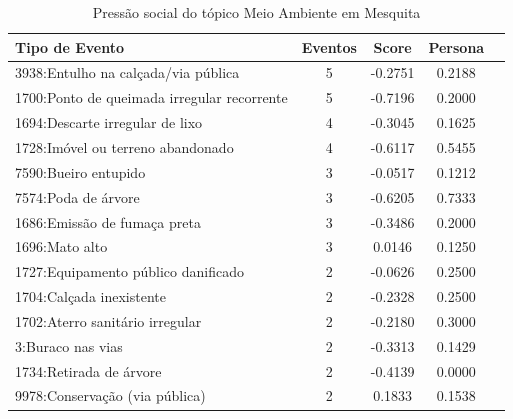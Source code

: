\begin{table}[htbp]
	\centering
	\caption{Pressão social do tópico Meio Ambiente em Mesquita}
	\label{tab:eventos_populares_mesquita}
	\begin{tabular}{|l|c|c|c|c|}
		\hline
		\textbf{Tipo de Evento}                         & \textbf{Eventos} & \textbf{Score} & \textbf{Persona} \\
		\hline
		3938:Entulho na calçada/via pública             & 5                & -0.2751        & 0.2188           \\
		\hline
		1700:Ponto de queimada irregular recorrente     & 5                & -0.7196        & 0.2000           \\
		\hline
		1694:Descarte irregular de lixo                 & 4                & -0.3045        & 0.1625           \\
		\hline
		1728:Imóvel ou terreno abandonado               & 4                & -0.6117        & 0.5455           \\
		\hline
		7590:Bueiro entupido                            & 3                & -0.0517        & 0.1212           \\
		\hline
		7574:Poda de árvore                             & 3                & -0.6205        & 0.7333           \\
		\hline
		1686:Emissão de fumaça preta                    & 3                & -0.3486        & 0.2000           \\
		\hline
		1696:Mato alto                                  & 3                & 0.0146         & 0.1250           \\
		\hline
		1727:Equipamento público danificado             & 2                & -0.0626        & 0.2500           \\
		\hline
		1704:Calçada inexistente                        & 2                & -0.2328        & 0.2500           \\
		\hline
		1702:Aterro sanitário irregular                 & 2                & -0.2180        & 0.3000           \\
		\hline
		3:Buraco nas vias                               & 2                & -0.3313        & 0.1429           \\
		\hline
		1734:Retirada de árvore                         & 2                & -0.4139        & 0.0000           \\
		\hline
		9978:Conservação (via pública)                  & 2                & 0.1833         & 0.1538           \\
		\hline

\end{tabular}
\end{table}
